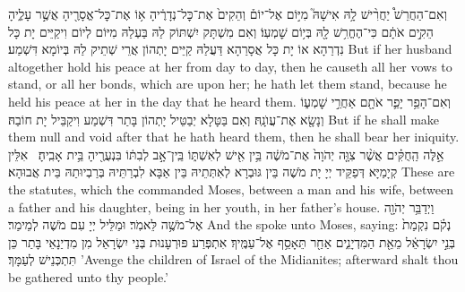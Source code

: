 {וְאִם־הַחֲרֵשׁ֩ יַחֲרִ֨ישׁ לָ֥הּ אִישָׁהּ֮ מִיּ֣וֹם אֶל־יוֹם֒ וְהֵקִים֙ אֶת־כׇּל־נְדָרֶ֔יהָ א֥וֹ אֶת־כׇּל־אֱסָרֶ֖יהָ אֲשֶׁ֣ר עָלֶ֑יהָ הֵקִ֣ים אֹתָ֔ם כִּי־הֶחֱרִ֥שׁ לָ֖הּ בְּי֥וֹם שׇׁמְעֽוֹ׃
}
{וְאִם מִשְׁתָּק יִשְׁתּוֹק לַהּ בַּעְלַהּ מִיּוֹם לְיוֹם וִיקַיֵּים יָת כָּל נִדְרַהָא אוֹ יָת כָּל אֲסָרַהָא דַּעֲלַהּ קַיֵּים יָתְהוֹן אֲרֵי שְׁתֵיק לַהּ בְּיוֹמָא דִּשְׁמַע׃}
{But if her husband altogether hold his peace at her from day to day, then he causeth all her vows to stand, or all her bonds, which are upon her; he hath let them stand, because he held his peace at her in the day that he heard them.}{}
{וְאִם־הָפֵ֥ר יָפֵ֛ר אֹתָ֖ם אַחֲרֵ֣י שׇׁמְע֑וֹ וְנָשָׂ֖א אֶת־עֲוֺנָֽהּ׃
}
{וְאִם בַּטָּלָא יְבַטֵּיל יָתְהוֹן בָּתַר דִּשְׁמַע וִיקַבֵּיל יָת חוֹבַהּ׃}
{But if he shall make them null and void after that he hath heard them, then he shall bear her iniquity.}{}
{אֵ֣לֶּה הַֽחֻקִּ֗ים אֲשֶׁ֨ר צִוָּ֤ה יְהֹוָה֙ אֶת־מֹשֶׁ֔ה בֵּ֥ין אִ֖ישׁ לְאִשְׁתּ֑וֹ בֵּֽין־אָ֣ב לְבִתּ֔וֹ בִּנְעֻרֶ֖יהָ בֵּ֥ית אָבִֽיהָ׃ \petucha }
{אִלֵּין קְיָמַיָּא דְּפַקֵּיד יְיָ יָת מֹשֶׁה בֵּין גּוּבְרָא לְאִתְּתֵיהּ בֵּין אַבָּא לִבְרַתֵּיהּ בְּרַבְיוּתַהּ בֵּית אֲבוּהָא׃}
{These are the statutes, which the \lord\space commanded Moses, between a man and his wife, between a father and his daughter, being in her youth, in her father’s house.}{}
\newperek
{}%
{וַיְדַבֵּ֥ר יְהֹוָ֖ה אֶל־מֹשֶׁ֥ה לֵּאמֹֽר׃}
{וּמַלֵּיל יְיָ עִם מֹשֶׁה לְמֵימַר׃}
{And the \lord\space spoke unto Moses, saying:}{}
{נְקֹ֗ם נִקְמַת֙ בְּנֵ֣י יִשְׂרָאֵ֔ל מֵאֵ֖ת הַמִּדְיָנִ֑ים אַחַ֖ר תֵּאָסֵ֥ף אֶל־עַמֶּֽיךָ׃
}
{אִתְפְּרַע פּוּרְעָנוּת בְּנֵי יִשְׂרָאֵל מִן מִדְיַנָאֵי בָּתַר כֵּן תִּתְכְּנֵישׁ לְעַמָּךְ׃}
{’Avenge the children of Israel of the Midianites; afterward shalt thou be gathered unto thy people.’}{}
